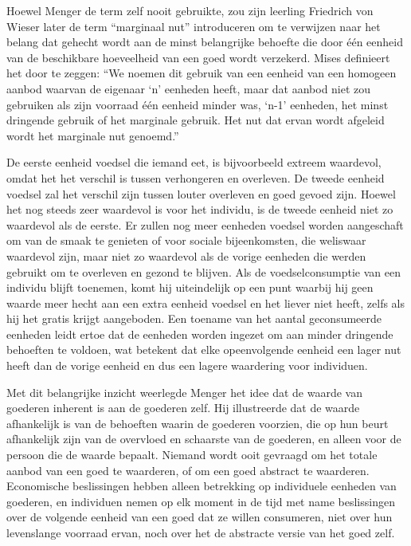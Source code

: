 Hoewel Menger de term zelf nooit gebruikte, zou zijn leerling Friedrich von Wieser later de term “marginaal nut” introduceren om te verwijzen naar het belang dat gehecht wordt aan de minst belangrijke behoefte die door één eenheid van de beschikbare hoeveelheid van een goed wordt verzekerd. Mises definieert het door te zeggen: “We noemen dit gebruik van een eenheid van een homogeen aanbod waarvan de eigenaar `n' eenheden heeft, maar dat aanbod niet zou gebruiken als zijn voorraad één eenheid minder was, `n-1' eenheden, het minst dringende gebruik of het marginale gebruik. Het nut dat ervan wordt afgeleid wordt het marginale nut genoemd.”\autocite{21}

De eerste eenheid voedsel die iemand eet, is bijvoorbeeld extreem waardevol, omdat het het verschil is tussen verhongeren en overleven. De tweede eenheid voedsel zal het verschil zijn tussen louter overleven en goed gevoed zijn. Hoewel het nog steeds zeer waardevol is voor het individu, is de tweede eenheid niet zo waardevol als de eerste. Er zullen nog meer eenheden voedsel worden aangeschaft om van de smaak te genieten of voor sociale bijeenkomsten, die weliswaar waardevol zijn, maar niet zo waardevol als de vorige eenheden die werden gebruikt om te overleven en gezond te blijven. Als de voedselconsumptie van een individu blijft toenemen, komt hij uiteindelijk op een punt waarbij hij geen waarde meer hecht aan een extra eenheid voedsel en het liever niet heeft, zelfs als hij het gratis krijgt aangeboden. Een toename van het aantal geconsumeerde eenheden leidt ertoe dat de eenheden worden ingezet om aan minder dringende behoeften te voldoen, wat betekent dat elke opeenvolgende eenheid een lager nut heeft dan de vorige eenheid en dus een lagere waardering voor individuen. 

Met dit belangrijke inzicht weerlegde Menger het idee dat de waarde van goederen inherent is aan de goederen zelf. Hij illustreerde dat de waarde afhankelijk is van de behoeften waarin de goederen voorzien, die op hun beurt afhankelijk zijn van de overvloed en schaarste van de goederen, en alleen voor de persoon die de waarde bepaalt. Niemand wordt ooit gevraagd om het totale aanbod van een goed te waarderen, of om een goed abstract te waarderen. Economische beslissingen hebben alleen betrekking op individuele eenheden van goederen, en individuen nemen op elk moment in de tijd met name beslissingen over de volgende eenheid van een goed dat ze willen consumeren, niet over hun levenslange voorraad ervan, noch over het de abstracte versie van het goed zelf.

